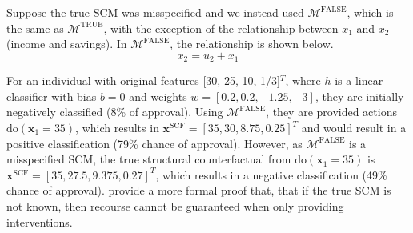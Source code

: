 Suppose the true SCM was misspecified and we instead used $\mathcal{M}^{\text{FALSE}}$, which is the same as $\mathcal{M}^{\text{TRUE}}$, with the exception of the relationship between $x_1$ and $x_2$ (income and savings). In $\mathcal{M}^{\text{FALSE}}$, the relationship is shown below.\\

\begin{equation}
	x_2 = u_2 + x_1
\end{equation}

For an individual with original features [30, 25, 10, 1/3]$^T$, where $h$ is a linear classifier with bias $b=0$ and weights $w=[0.2, 0.2, -1.25, -3]$, they are initially negatively classified (8\% of approval). Using $\mathcal{M}^{\text{FALSE}}$, they are provided actions $\text{do}(\mathbf{x}_1=35)$, which results in $\mathbf{x}^{\text{SCF}} = [35, 30, 8.75, 0.25]^T$ and would result in a positive classification (79\% chance of approval). However, as $\mathcal{M}^{\text{FALSE}}$ is a misspecified SCM, the true structural counterfactual from $\text{do}(\mathbf{x}_1=35)$ is $\mathbf{x}^{\text{SCF}} = [35, 27.5, 9.375, 0.27]^T$, which results in a negative classification (49\% chance of approval). \textcite{karimiAlgorithmicRecourseImperfect2020} provide a more formal proof that, that if the true SCM is not known, then recourse cannot be guaranteed when only providing interventions.










